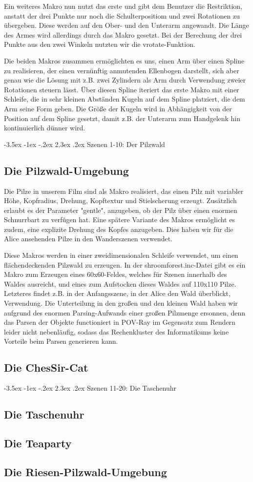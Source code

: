 \documentclass[twocolumn]{article}
\makeatletter
\renewcommand\section{\@startsection{section}{1}{\z@}%
                                      {-3.5ex \@plus -1ex \@minus -.2ex}%
                                      {2.3ex \@plus.2ex}%
                                      {\normalfont\large\bfseries}}
\makeatother
\begin{document}
Ein weiteres Makro nun nutzt das erste und gibt dem Benutzer die Restriktion, anstatt der drei Punkte nur noch die Schulterpositiom und zwei Rotationen zu übergeben.
Diese werden auf den Ober- und den Unterarm angewandt. Die Länge des Armes wird allerdings durch das Makro gesetzt.
Bei der Berechung der drei Punkte aus den zwei Winkeln nutzten wir die vrotate-Funktion.

Die beiden Makros zusammen ermöglichten es uns, einen Arm über einen Spline zu realisieren, der einen vernünftig anmutenden Ellenbogen darstellt, sich aber genau wie die Lösung mit z.B. zwei Zylindern als Arm durch Verwendung zweier Rotationen steuern lässt.
Über diesen Spline iteriert das erste Makro mit einer Schleife, die in sehr kleinen Abständen Kugeln auf dem Spline platziert, die dem Arm seine Form geben.
Die Größe der Kugeln wird in Abhängigkeit von der Position auf dem Spline gesetzt, damit z.B. der Unterarm zum Handgelenk hin kontinuierlich dünner wird.

\section{Szenen 1-10: Der Pilzwald}
\subsection{Die Pilzwald-Umgebung}
Die Pilze in unserem Film sind als Makro realisiert, das einen Pilz mit variabler Höhe, Kopfradius, Drehung, Kopftextur und Stielscherung erzeugt. Zusätzlich erlaubt es der Parameter "gentle", anzugeben, ob der Pilz über einen enormen Schnurrbart zu verfügen hat.
Eine spätere Variante des Makros ermöglicht es zudem, eine explizite Drehung des Kopfes anzugeben. Dies haben wir für die Alice ansehenden Pilze in den Wanderszenen verwendet.

Diese Makros werden in einer zweidimensionalen Schleife verwendet, um einen flächendeckenden Pilzwald zu erzeugen.
In der shroomforest.inc-Datei gibt es ein Makro zum Erzeugen eines 60x60-Feldes, welches für Szenen innerhalb des Waldes ausreicht, und eines zum Aufstocken dieses Waldes auf 110x110 Pilze. Letzteres findet z.B. in der Anfangsszene, in der Alice den Wald überblickt, Verwendung.
Die Unterteilung in den großen und den kleinen Wald haben wir aufgrund des enormen Parsing-Aufwands einer großen Pilzmenge ersonnen, denn das Parsen der Objekte functioniert in POV-Ray im Gegensatz zum Rendern leider nicht nebenläufig, sodass das Rechenkluster des Informatikums keine Vorteile beim Parsen generieren kann.

\subsection{Die ChesSir-Cat}

\section{Szenen 11-20: Die Taschenuhr}
\subsection{Die Taschenuhr}
\subsection{Die Teaparty}
\subsection{Die Riesen-Pilzwald-Umgebung}
\end{document}
